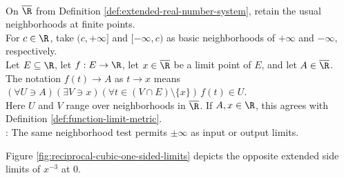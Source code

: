 \begin{definition} \label{def:extended-real-function-limits} \\
On $\overline{\R}$ from Definition \ref{def:extended-real-number-system}, retain the usual neighborhoods at finite points.\\
For $c\in\R$, take $(c,+\infty]$ and $[-\infty,c)$ as basic neighborhoods of $+\infty$ and $-\infty$, respectively.\\
Let $E\subseteq\R$, let $f:E\to\R$, let $x\in\overline{\R}$ be a limit point of $E$, and let $A\in\overline{\R}$.\\
The notation $f(t)\to A$ as $t\to x$ means $(\forall U\ni A)(\exists V\ni x)(\forall t\in(V\cap E)\setminus\{x\})\,f(t)\in U$.\\
Here $U$ and $V$ range over neighborhoods in $\overline{\R}$. If $A,x\in\R$, this agrees with Definition \ref{def:function-limit-metric}.\\
: The same neighborhood test permits $\pm\infty$ as input or output limits.
\end{definition}

\noindent Figure \ref{fig:reciprocal-cubic-one-sided-limits} depicts the opposite extended side limits of $x^{-3}$ at $0$.

\begin{visualizationfigure}[H]
  \centering
  
  \caption{Qualitative dimensionless plot: a positive vertical rescaling of $y=x^{-3}$ tends to $-\infty$ as $x\to0^-$ and to $+\infty$ as $x\to0^+$.}
  \label{fig:reciprocal-cubic-one-sided-limits}
\end{visualizationfigure}

